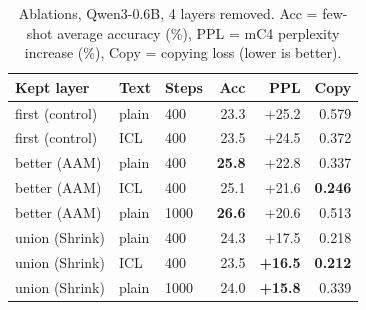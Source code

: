 \documentclass[11pt]{article}
\begin{document}
\begin{table}[t]
\centering\small
{}
\caption{Training settings, identical for every trained method.}
\label{tab:hparams}
\end{table}

\begin{table}[t]
\centering\small
\begin{tabular}{lllrrr}
\toprule
Kept layer & Text & Steps & Acc & PPL & Copy \\
\midrule
first (control) & plain & 400 & 23.3 & +25.2 & 0.579 \\
first (control) & ICL & 400 & 23.5 & +24.5 & 0.372 \\
better (AAM) & plain & 400 & \textbf{25.8} & +22.8 & 0.337 \\
better (AAM) & ICL & 400 & 25.1 & +21.6 & \textbf{0.246} \\
better (AAM) & plain & 1000 & \textbf{26.6} & +20.6 & 0.513 \\
union (Shrink) & plain & 400 & 24.3 & +17.5 & 0.218 \\
union (Shrink) & ICL & 400 & 23.5 & \textbf{+16.5} & \textbf{0.212} \\
union (Shrink) & plain & 1000 & 24.0 & \textbf{+15.8} & 0.339 \\
\bottomrule
\end{tabular}
\caption{Ablations, Qwen3-0.6B, 4 layers removed. Acc = few-shot average accuracy (\%), PPL = mC4 perplexity
increase (\%), Copy = copying loss (lower is better).}
\label{tab:ablation}
\end{table}
\end{document}
